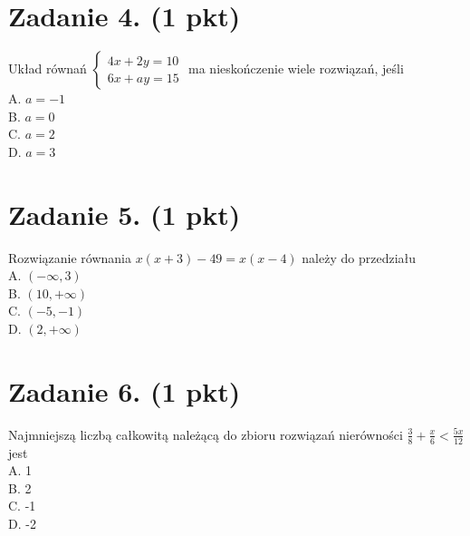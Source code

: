 \documentclass[10pt]{article}
\begin{document}
\section*{Zadanie 4. (1 pkt)}
Układ równań \(\left\{\begin{array}{l}4 x+2 y=10 \\ 6 x+a y=15\end{array}\right.\) ma nieskończenie wiele rozwiązań, jeśli\\
A. \(a=-1\)\\
B. \(a=0\)\\
C. \(a=2\)\\
D. \(a=3\)

\section*{Zadanie 5. (1 pkt)}
Rozwiązanie równania \(x(x+3)-49=x(x-4)\) należy do przedziału\\
A. \((-\infty, 3)\)\\
B. \((10,+\infty)\)\\
C. \((-5,-1)\)\\
D. \((2,+\infty)\)

\section*{Zadanie 6. (1 pkt)}
Najmniejszą liczbą całkowitą należącą do zbioru rozwiązań nierówności \(\frac{3}{8}+\frac{x}{6}<\frac{5 x}{12}\) jest\\
A. 1\\
B. 2\\
C. -1\\
D. -2
\end{document}
